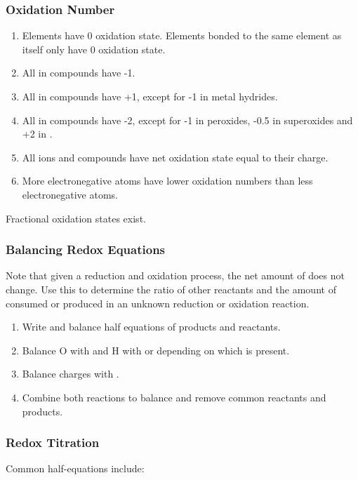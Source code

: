 \documentclass[../main]{subfiles}
\begin{document}
	\subsubsection{Oxidation Number}

	\begin{enumerate}
		\item Elements have 0 oxidation state. Elements bonded to the same element as itself only have 0 oxidation state.
		\item All  in compounds have -1.
		\item All  in compounds have +1, except for -1 in metal hydrides.
		\item All  in compounds have -2, except for -1 in peroxides, -0.5 in superoxides and +2 in .
		\item All ions and compounds have net oxidation state equal to their charge.
		\item More electronegative atoms have lower oxidation numbers than less electronegative atoms.
	\end{enumerate}

	Fractional oxidation states exist.

	\subsubsection{Balancing Redox Equations}

	Note that given a reduction and oxidation process, the net amount of  does not change. Use this to determine the ratio of other reactants and the amount of  consumed or produced in an unknown reduction or oxidation reaction.

	\begin{enumerate}
		\item Write and balance half equations of products and reactants.
		\item Balance O with  and H with  or  depending on which is present.
		\item Balance charges with .
		\item Combine both reactions to balance  and remove common reactants and products.
	\end{enumerate}

	\subsubsection{Redox Titration}

	Common half-equations include:
\end{document}
